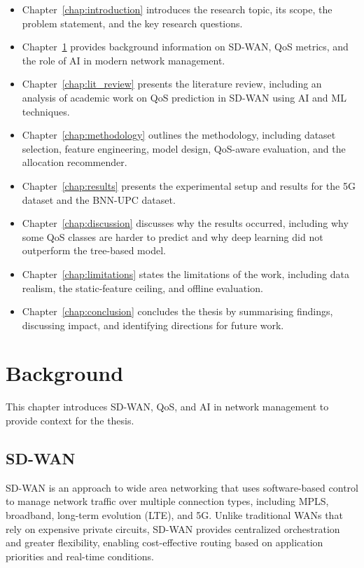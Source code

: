 \documentclass[a4paper,12pt]{Classes/RoboticsLaTeX}
\begin{document}
    \begin{itemize}
        \item Chapter~\ref{chap:introduction} introduces the research topic, its scope, the problem statement, and the key research questions.
        \item Chapter~\ref{chap:backg} provides background information on SD-WAN, QoS metrics, and the role of AI in modern network management.
        \item Chapter~\ref{chap:lit_review} presents the literature review, including an analysis of academic work on QoS prediction in SD-WAN using AI and ML techniques.
        \item Chapter~\ref{chap:methodology} outlines the methodology, including dataset selection, feature engineering, model design, QoS-aware evaluation, and the allocation recommender.
        \item Chapter~\ref{chap:results} presents the experimental setup and results for the 5G dataset and the BNN-UPC dataset.
        \item Chapter~\ref{chap:discussion} discusses why the results occurred, including why some QoS classes are harder to predict and why deep learning did not outperform the tree-based model.
        \item Chapter~\ref{chap:limitations} states the limitations of the work, including data realism, the static-feature ceiling, and offline evaluation.
        \item Chapter~\ref{chap:conclusion} concludes the thesis by summarising findings, discussing impact, and identifying directions for future work.
    \end{itemize}


    \chapter{Background}
    \label{chap:backg}
    
    This chapter introduces SD-WAN, QoS, and AI in network management to provide context for the thesis.

    \section{SD-WAN}
    
    SD-WAN is an approach to wide area networking that uses software-based control to manage network traffic over multiple connection types, including MPLS, broadband, long-term evolution (LTE), and 5G. Unlike traditional WANs that rely on expensive private circuits, SD-WAN provides centralized orchestration and greater flexibility, enabling cost-effective routing based on application priorities and real-time conditions.
    
\end{document}
